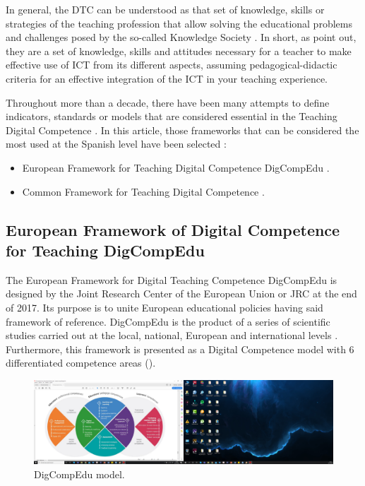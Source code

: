 \documentclass{textolivre}
\begin{document}
In general, the DTC can be understood as that set of knowledge, skills or
strategies of the teaching profession that allow solving the educational
problems and challenges posed by the so-called Knowledge Society \cite{prendesEspinosa2011,CaberoAlmenara2020}.
In short, as \textcite{duranCuartero2019} point out, they are a set of knowledge, skills and attitudes
necessary for a teacher to make effective use of ICT from its different
aspects, assuming pedagogical-didactic criteria for an effective integration of
the ICT in your teaching experience.

Throughout more than a decade, there have been many attempts to define
indicators, standards or models that are considered essential in the Teaching
Digital Competence \cite{CaberoAlmenara2020,caberoAlmenara2020b}.
In this article, those frameworks that can be considered the most used
at the Spanish level have been selected \cite{caberoAlmenara2019,lazaroCantabrana2019,padillaHernandez2019,rodrguezGarca2019,silva2019,caberoAlmenara2019}:

\begin{itemize}
\item European Framework for Teaching Digital Competence DigCompEdu \cite{redecker2017}.
\item Common Framework for Teaching Digital Competence \cite{intef2017}.
\end{itemize}


\subsection{European Framework of Digital Competence for Teaching DigCompEdu}\label{sec-euro-fram}

The European Framework for Digital Teaching Competence DigCompEdu is designed
by the Joint Research Center of the European Union or JRC \cite{redecker2017}
at the end of 2017. Its purpose is to unite European educational policies
having said framework of reference. DigCompEdu is the product of a series of
scientific studies carried out at the local, national, European and
international levels \cite{caberoAlmenara2020a,Ghomi2019,redecker2017,reisolu2020}.
Furthermore, this framework is presented as a Digital Competence
model with 6 differentiated competence areas ().

\begin{figure}[htbp]
 \centering
 \includegraphics[width=\textwidth]{fig01.png}
 \caption{DigCompEdu model.}
 \label{fig01}
\end{figure}
\end{document}

